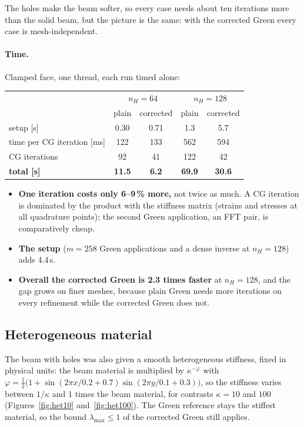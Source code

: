 \documentclass[11pt,a4paper]{article}
\begin{document}
The holes make the beam softer, so every case needs about ten iterations more than the solid beam, but the picture is
the same: with the corrected Green every case is mesh-independent.

\paragraph{Time.} Clamped face, one thread, each run timed alone:

\begin{center}
\small
\begin{tabular}{lcccc}
  \toprule
  & \multicolumn{2}{c}{$n_H = 64$} & \multicolumn{2}{c}{$n_H = 128$} \\
  & plain & corrected & plain & corrected \\
  \midrule
  setup [s]                 & 0.30 & 0.71 & 1.3 & 5.7 \\
  time per CG iteration [ms] & 122 & 133 & 562 & 594 \\
  CG iterations             & 92 & 41 & 122 & 42 \\
  \textbf{total [s]}        & \textbf{11.5} & \textbf{6.2} & \textbf{69.9} & \textbf{30.6} \\
  \bottomrule
\end{tabular}
\end{center}

\begin{itemize}
  \item \textbf{One iteration costs only 6--9\,\% more,} not twice as much. A CG iteration is dominated by the product
        with the stiffness matrix (strains and stresses at all quadrature points); the second Green application, an FFT
        pair, is comparatively cheap.
  \item \textbf{The setup} ($m = 258$ Green applications and a dense inverse at $n_H = 128$) adds 4.4\,s.
  \item \textbf{Overall the corrected Green is 2.3 times faster} at $n_H = 128$, and the gap grows on finer meshes,
        because plain Green needs more iterations on every refinement while the corrected Green does not.
\end{itemize}

\subsection*{Heterogeneous material}
\label{sec:hetero}

The beam with holes was also given a smooth heterogeneous stiffness, fixed in physical units: the beam material is
multiplied by $\kappa^{-\varphi}$ with $\varphi = \tfrac12\bigl(1 + \sin(2\pi x/0.2 + 0.7)\sin(2\pi y/0.1 + 0.3)\bigr)$, so
the stiffness varies between $1/\kappa$ and 1 times the beam material, for contrasts $\kappa = 10$ and $100$
(Figures~\ref{fig:het10} and~\ref{fig:het100}). The Green reference stays the stiffest material, so the bound
$\lambda_{\max} \le 1$ of the corrected Green still applies.
\end{document}
